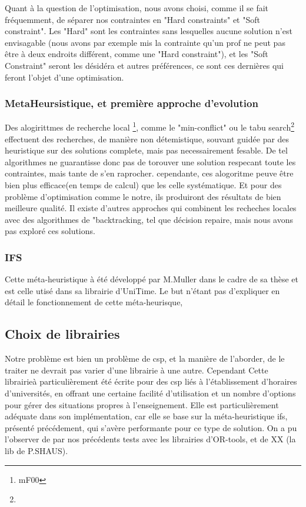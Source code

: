 Quant à la question de l'optimisation, nous avons choisi, comme il se fait fréquemment, de séparer nos contraintes en "Hard constraints" et "Soft constraint".  Les "Hard" sont les contraintes sans lesquelles aucune solution n'est envisagable (nous avons par exemple mis la contrainte qu'un prof ne peut pas être à deux endroits différent, comme une "Hard constraint"), et les "Soft Constraint" seront les désidéra et autres préférences, ce sont ces dernières qui feront l'objet d'une optimisation. 
\subsubsection{MetaHeursistique, et première approche d'evolution}
Des alogirittmes de recherche local \footnote{mF00}, comme le "min-conflict" ou le tabu search\footnote{} effectuent des recherches, de manière non détemistique, souvant guidée par des heuristique sur des solutions complete, mais pas necessairement fesable.  De tel algorithmes ne guarantisse donc pas de torouver une solution respecant toute les contraintes, mais tante de s'en raprocher. cependante, ces alogoritme peuve être bien plus efficace(en temps de calcul) que les celle systématique. Et pour des problème d'optimisation comme le notre, ils produiront des résultats de bien meilleure qualité.
Il existe d'autres approches qui combinent les recheches locales avec des algorithmes de "backtracking, tel que décision repaire, mais nous avons pas exploré ces solutions.

\subsubsection{IFS}
Cette méta-heuristique à été développé par M.Muller dans le cadre de sa thèse et est celle utisé dans sa librairie d'UniTime. 
Le but n'étant pas d'expliquer en détail le fonctionnement de cette méta-heurisque, 

\subsection{Choix de librairies}
Notre problème est bien un problème de csp, et la manière de l'aborder, de le traiter ne devrait pas varier d'une librairie à une autre.  Cependant Cette librairieà particulièrement été écrite pour des csp liés à l'établissement d'horaires d'universités, en offrant une certaine facilité d'utilisation et un nombre d'options pour gérer des situations propres à l'enseignement.
Elle est particulièrement adéquate dans son implémentation, car elle se base sur la méta-heuristique ifs, présenté précédement, qui s'avère performante pour ce type de solution.  On a pu l'observer de par nos précédents tests avec les librairies d'OR-tools, et de XX (la lib de P.SHAUS).

